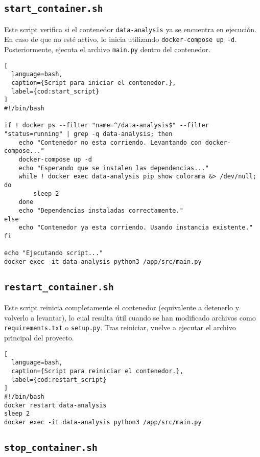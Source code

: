\subsection{\texttt{start\_container.sh}}

Este script verifica si el contenedor \texttt{data-analysis} ya se encuentra en ejecución. En caso de que no esté activo, lo inicia utilizando \texttt{docker-compose up -d}. Posteriormente, ejecuta el archivo \texttt{main.py} dentro del contenedor.

\begin{lstlisting}[
  language=bash,
  caption={Script para iniciar el contenedor.},
  label={cod:start_script}
]
#!/bin/bash

if ! docker ps --filter "name=^/data-analysis$" --filter "status=running" | grep -q data-analysis; then
    echo "Contenedor no esta corriendo. Levantando con docker-compose..."
    docker-compose up -d
    echo "Esperando que se instalen las dependencias..."
    while ! docker exec data-analysis pip show colorama &> /dev/null; do
        sleep 2
    done
    echo "Dependencias instaladas correctamente."
else
    echo "Contenedor ya esta corriendo. Usando instancia existente."
fi

echo "Ejecutando script..."
docker exec -it data-analysis python3 /app/src/main.py
\end{lstlisting}

\subsection{\texttt{restart\_container.sh}}

Este script reinicia completamente el contenedor (equivalente a detenerlo y volverlo a levantar), lo cual resulta útil cuando se han modificado archivos como \texttt{requirements.txt} o \texttt{setup.py}. Tras reiniciar, vuelve a ejecutar el archivo principal del proyecto.

\begin{lstlisting}[
  language=bash,
  caption={Script para reiniciar el contenedor.},
  label={cod:restart_script}
]
#!/bin/bash
docker restart data-analysis
sleep 2
docker exec -it data-analysis python3 /app/src/main.py
\end{lstlisting}

\subsection{\texttt{stop\_container.sh}}

